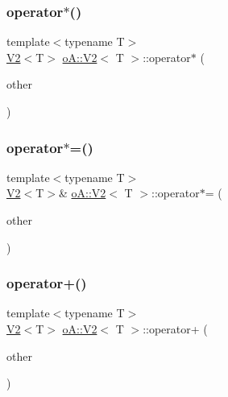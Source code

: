 \mbox{\label{structo_a_1_1_v2_a9e3ca71d8d85ad4bbcb418080acafceb}} 
\subsubsection{\texorpdfstring{operator$\ast$()}{operator*()}}
{\footnotesize\ttfamily template$<$typename T$>$ \\
\mbox{\hyperlink{structo_a_1_1_v2}{V2}}$<$T$>$ \mbox{\hyperlink{structo_a_1_1_v2}{o\+A\+::\+V2}}$<$ T $>$\+::operator$\ast$ (\begin{DoxyParamCaption}\item[{const \mbox{\hyperlink{structo_a_1_1_v2}{o\+A\+::\+V2}}$<$ T $>$ \&}]{other }\end{DoxyParamCaption})\hspace{0.3cm}{\ttfamily [inline]}}

\mbox{\label{structo_a_1_1_v2_ae618eb05f845b5a4219d198e33f79699}} 
\subsubsection{\texorpdfstring{operator$\ast$=()}{operator*=()}}
{\footnotesize\ttfamily template$<$typename T$>$ \\
\mbox{\hyperlink{structo_a_1_1_v2}{V2}}$<$T$>$\& \mbox{\hyperlink{structo_a_1_1_v2}{o\+A\+::\+V2}}$<$ T $>$\+::operator$\ast$= (\begin{DoxyParamCaption}\item[{const \mbox{\hyperlink{structo_a_1_1_v2}{o\+A\+::\+V2}}$<$ T $>$ \&}]{other }\end{DoxyParamCaption})\hspace{0.3cm}{\ttfamily [inline]}}

\mbox{\label{structo_a_1_1_v2_a9b089bbe3ae2f0a2166a79eb240159ad}} 
\subsubsection{\texorpdfstring{operator+()}{operator+()}}
{\footnotesize\ttfamily template$<$typename T$>$ \\
\mbox{\hyperlink{structo_a_1_1_v2}{V2}}$<$T$>$ \mbox{\hyperlink{structo_a_1_1_v2}{o\+A\+::\+V2}}$<$ T $>$\+::operator+ (\begin{DoxyParamCaption}\item[{const \mbox{\hyperlink{structo_a_1_1_v2}{o\+A\+::\+V2}}$<$ T $>$ \&}]{other }\end{DoxyParamCaption})\hspace{0.3cm}{\ttfamily [inline]}}

